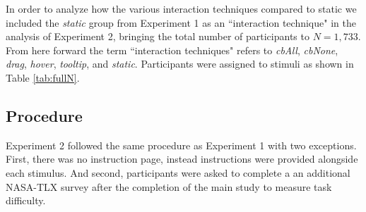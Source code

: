 In order to analyze how the various interaction techniques compared to static we included the \textit{static} group from Experiment 1 as an ``interaction technique" in the analysis of Experiment 2, bringing the total number of participants to $N = 1,733$. From here forward the term ``interaction techniques" refers to \textit{cbAll}, \textit{cbNone}, \textit{drag}, \textit{hover}, \textit{tooltip}, and \textit{static}. Participants were assigned to stimuli as shown in Table \ref{tab:fullN}. 

\begin{table}[h!]
\caption{Sample sizes (N) for each condition in Experiment 2.}
\label{tab:fullN}
\end{table}

\subsection{Procedure}
Experiment 2 followed the same procedure as Experiment 1 with two exceptions. First, there was no instruction page, instead instructions were provided alongside each stimulus. And second, participants were asked to complete a an additional NASA-TLX\cite{NASATLX} survey after the completion of the main study to measure task difficulty.

